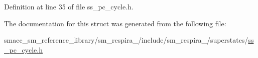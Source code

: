 Definition at line 35 of file ss\+\_\+pc\+\_\+cycle.\+h.



The documentation for this struct was generated from the following file\+:\begin{DoxyCompactItemize}
\item 
smacc\+\_\+sm\+\_\+reference\+\_\+library/sm\+\_\+respira\+\_/include/sm\+\_\+respira\+\_/superstates/\hyperlink{ss__pc__cycle_8h}{ss\+\_\+pc\+\_\+cycle.\+h}\end{DoxyCompactItemize}
